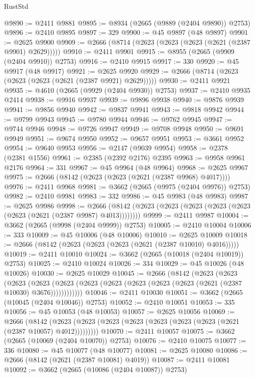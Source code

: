 \begin{lexlean}{RustStd}
\begin{coremodule}
@9890 := @2411 @9881
@9895 := @8934 (@2665 (@9889 (@2404 @9890)) @2753)
@9896 := @2410 @9895
@9897 := 329
@9900 := @45 @9897 (@48 @9897)
@9901 := @2625 @9900
@9909 := @2666 (@8714 (@2623 (@2623 (@2623 (@2621 (@2387 @9901) @2629)))))
@9910 := @2411 @9901
@9915 := @8955 (@2665 (@9909 (@2404 @9910)) @2753)
@9916 := @2410 @9915
@9917 := 330
@9920 := @45 @9917 (@48 @9917)
@9921 := @2625 @9920
@9929 := @2666 (@8714 (@2623 (@2623 (@2623 (@2621 (@2387 @9921) @2629)))))
@9930 := @2411 @9921
@9935 := @4610 (@2665 (@9929 (@2404 @9930)) @2753)
@9937 := @2410 @9935 @2414
@9938 := @9916 @9937
@9939 := @9896 @9938
@9940 := @9876 @9939
@9941 := @9856 @9940
@9942 := @9837 @9941
@9943 := @9818 @9942
@9944 := @9799 @9943
@9945 := @9780 @9944
@9946 := @9762 @9945
@9947 := @9744 @9946
@9948 := @9726 @9947
@9949 := @9708 @9948
@9950 := @9691 @9949
@9951 := @9674 @9950
@9952 := @9657 @9951
@9953 := @3661 @9952
@9954 := @9640 @9953
@9956 := @2147 (@9039 @9954)
@9958 := @2378 (@2381 @1556)
@9961 := @2385 (@2392 @2176) @2395
@9963 := @9958 @9961 @2176
@9964 := 331
@9967 := @45 @9964 (@48 @9964)
@9968 := @2625 @9967
@9975 := @2666 (@8142 (@2623 (@2623 (@2621 (@2387 @9968) @4017))))
@9976 := @2411 @9968
@9981 := @3662 (@2665 (@9975 (@2404 @9976)) @2753)
@9982 := @2410 @9981
@9983 := 332
@9986 := @45 @9983 (@48 @9983)
@9987 := @2625 @9986
@9998 := @2666 (@8142 (@2623 (@2623 (@2623 (@2623 (@2623 (@2623 (@2621 (@2387 @9987) @4013))))))))
@9999 := @2411 @9987
@10004 := @3662 (@2665 (@9998 (@2404 @9999)) @2753)
@10005 := @2410 @10004
@10006 := 333
@10009 := @45 @10006 (@48 @10006)
@10010 := @2625 @10009
@10018 := @2666 (@8142 (@2623 (@2623 (@2623 (@2621 (@2387 @10010) @4016)))))
@10019 := @2411 @10010
@10024 := @3662 (@2665 (@10018 (@2404 @10019)) @2753)
@10025 := @2410 @10024
@10026 := 334
@10029 := @45 @10026 (@48 @10026)
@10030 := @2625 @10029
@10045 := @2666
    (@8142
      (@2623
        (@2623
          (@2623
            (@2623 (@2623 (@2623 (@2623 (@2623 (@2623 (@2623 (@2621 (@2387 @10030) @3676))))))))))))
@10046 := @2411 @10030
@10051 := @3662 (@2665 (@10045 (@2404 @10046)) @2753)
@10052 := @2410 @10051
@10053 := 335
@10056 := @45 @10053 (@48 @10053)
@10057 := @2625 @10056
@10069 := @2666
    (@8142 (@2623 (@2623 (@2623 (@2623 (@2623 (@2623 (@2623 (@2621 (@2387 @10057) @4012)))))))))
@10070 := @2411 @10057
@10075 := @3662 (@2665 (@10069 (@2404 @10070)) @2753)
@10076 := @2410 @10075
@10077 := 336
@10080 := @45 @10077 (@48 @10077)
@10081 := @2625 @10080
@10086 := @2666 (@8142 (@2621 (@2387 @10081) @4019))
@10087 := @2411 @10081
@10092 := @3662 (@2665 (@10086 (@2404 @10087)) @2753)

\end{coremodule}
\end{lexlean}
